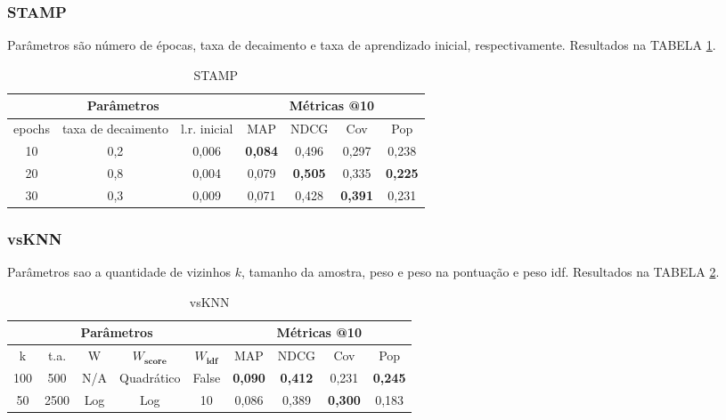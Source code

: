 \subsubsection{STAMP}
Parâmetros são número de épocas, taxa de decaimento e taxa de aprendizado inicial, respectivamente.
Resultados na TABELA \ref{opt:stamp_rem}.

\begin{table}[htbp]
  \centering
  \begin{tabular}{|c|c|c|c|c|c|c|}
    \hline
      \multicolumn{3}{|c|}{Parâmetros} & \multicolumn{4}{c|}{Métricas @10} \\
      \hline
      epochs & taxa de decaimento & l.r. inicial & MAP & NDCG & Cov & Pop \\
      \hline
      10 & 0,2 & 0,006 & \textbf{0,084} & 0,496 & 0,297 & 0,238 \\
      \hline
      20 & 0,8 & 0,004 & 0,079 & \textbf{0,505} & 0,335 & \textbf{0,225} \\
      \hline
      30 & 0,3 & 0,009 & 0,071 & 0,428 & \textbf{0,391} & 0,231 \\
      \hline
\end{tabular}
      \caption{STAMP}
      \label{opt:stamp_rem}
\end{table}

\subsubsection{vsKNN}
Parâmetros sao a quantidade de vizinhos $k$, tamanho da amostra, peso e peso na
pontuação e peso idf. Resultados na TABELA \ref{opt:vsknn_rem}.


\begin{table}[htbp]
  \centering
  \begin{tabular}{|c|c|c|c|c|c|c|c|c|}
    \hline
      \multicolumn{5}{|c|}{Parâmetros} & \multicolumn{4}{c|}{Métricas @10} \\
      \hline
      k & t.a. & W & $W_{\textbf{score}}$ & $W_{\textbf{idf}}$ & MAP & NDCG & Cov & Pop \\
      \hline
      100 & 500 & N/A & Quadrático & False & \textbf{0,090} & \textbf{0,412} & 0,231 & \textbf{0,245} \\
      \hline
      50 & 2500 & Log & Log & 10 & 0,086 & 0,389 & \textbf{0,300} & 0,183 \\
      \hline
\end{tabular}
      \caption{vsKNN}
      \label{opt:vsknn_rem}
\end{table}

